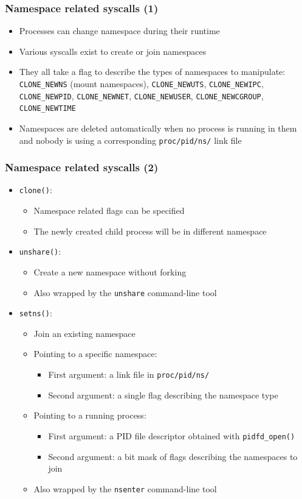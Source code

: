 \begin{frame}
	\frametitle{Namespace related syscalls (1)}
	\begin{itemize}
		\item Processes can change namespace during their runtime
		\item Various syscalls exist to create or join namespaces
		\item They all take a flag to describe the types of namespaces to manipulate:
			\texttt{CLONE\_NEWNS} (mount namespaces), \texttt{CLONE\_NEWUTS},
			\texttt{CLONE\_NEWIPC}, \texttt{CLONE\_NEWPID}, \texttt{CLONE\_NEWNET},
			\texttt{CLONE\_NEWUSER}, \texttt{CLONE\_NEWCGROUP},
			\texttt{CLONE\_NEWTIME}
		\item Namespaces are deleted automatically when no process is running in
			them and nobody is using a corresponding \texttt{proc/pid/ns/} link file
	\end{itemize}
\end{frame}

\begin{frame}
	\frametitle{Namespace related syscalls (2)}
	\begin{itemize}
		\item \texttt{clone()}:
			\begin{itemize}
				\item Namespace related flags can be specified
				\item The newly created child process will be in different namespace
			\end{itemize}
		\item \texttt{unshare()}:
			\begin{itemize}
				\item Create a new namespace without forking
				\item Also wrapped by the \texttt{unshare} command-line tool
			\end{itemize}
		\item \texttt{setns()}:
			\begin{itemize}
				\item Join an existing namespace
				\item Pointing to a specific namespace:
					\begin{itemize}
						\item First argument: a link file in \texttt{proc/pid/ns/}
						\item Second argument: a single flag describing the namespace type
					\end{itemize}
				\item Pointing to a running process:
					\begin{itemize}
						\item First argument: a PID file descriptor obtained with
							\texttt{pidfd\_open()}
						\item Second argument: a bit mask of flags describing the namespaces
							to join
					\end{itemize}
				\item Also wrapped by the \texttt{nsenter} command-line tool
			\end{itemize}
	\end{itemize}
\end{frame}

